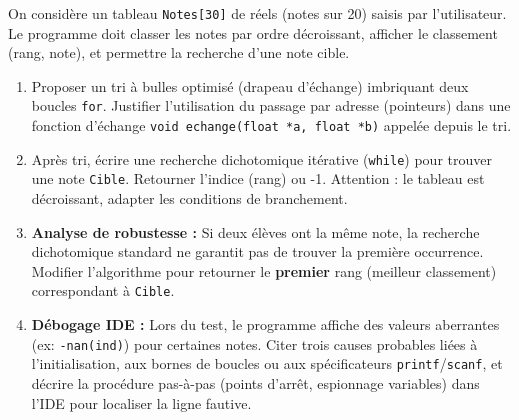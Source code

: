 \documentclass[11pt]{article}
\begin{document}
\begin{exercice}
On considère un tableau \texttt{Notes[30]} de réels (notes sur 20) saisis par l'utilisateur. Le programme doit classer les notes par ordre décroissant, afficher le classement (rang, note), et permettre la recherche d'une note cible.
\begin{enumerate}
    \item Proposer un tri à bulles optimisé (drapeau d'échange) imbriquant deux boucles \texttt{for}. Justifier l'utilisation du passage par adresse (pointeurs) dans une fonction d'échange \texttt{void echange(float *a, float *b)} appelée depuis le tri.
    \item Après tri, écrire une recherche dichotomique itérative (\texttt{while}) pour trouver une note \texttt{Cible}. Retourner l'indice (rang) ou -1. Attention : le tableau est décroissant, adapter les conditions de branchement.
    \item \textbf{Analyse de robustesse :} Si deux élèves ont la même note, la recherche dichotomique standard ne garantit pas de trouver la première occurrence. Modifier l'algorithme pour retourner le \textbf{premier} rang (meilleur classement) correspondant à \texttt{Cible}.
    \item \textbf{Débogage IDE :} Lors du test, le programme affiche des valeurs aberrantes (ex: \texttt{-nan(ind)}) pour certaines notes. Citer trois causes probables liées à l'initialisation, aux bornes de boucles ou aux spécificateurs \texttt{printf}/\texttt{scanf}, et décrire la procédure pas-à-pas (points d'arrêt, espionnage variables) dans l'IDE pour localiser la ligne fautive.
\end{enumerate}
\end{exercice}
\end{document}

